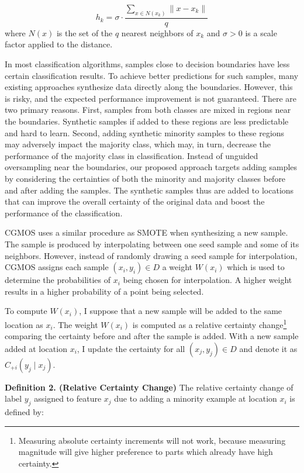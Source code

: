 \documentclass{iitthesis}
\begin{document}
\begin{equation}
h_k = \sigma \cdot \frac{\sum_{x \in N(x_k)} \| x-x_k \|}{q}
\end{equation}
where $N(x)$ is the set of the $q$ nearest neighbors of $x_k$ and $\sigma > 0$ is a scale factor applied to the distance. 

 In most classification algorithms, samples close to decision boundaries have less certain classification results. To achieve better predictions for such samples, many existing approaches synthesize data directly along the boundaries. However, this is risky, and the expected performance improvement is not guaranteed. There are two primary reasons. First, samples from both classes are mixed in regions near the boundaries. Synthetic samples if added to these regions are less predictable and hard to learn. Second, adding synthetic minority samples to these regions may adversely impact the majority class, which may, in turn, decrease the performance of the majority class in classification. Instead of unguided oversampling near the boundaries, our proposed approach targets adding samples by considering the certainties of both the minority and majority classes before and after adding the samples. The synthetic samples thus are added to locations that can improve the overall certainty of the original data and boost the performance of the classification.

CGMOS uses a similar procedure as SMOTE when synthesizing a new sample. The sample is produced by interpolating between one seed sample and some of its neighbors. However, instead of randomly drawing a seed sample for interpolation, CGMOS assigns each sample $(x_i, y_i) \in D$ a weight $W(x_i)$ which is used to determine the probabilities of $x_i$ being chosen for interpolation. A higher weight results in a higher probability of a point being selected.


To compute $W(x_i)$, I suppose that a new sample will be added to the same location as $x_i$. The weight $W(x_i)$ is computed as a relative certainty change\footnote{Measuring absolute certainty increments will not work, because measuring magnitude will give higher preference to parts which already have high certainty.} comparing the certainty before and after the sample is added. With a new sample added at location $x_i$, I update the certainty for all $(x_j, y_j) \in D$ and denote it as $C_{+i}(y_j \mid x_j)$. 

\noindent \textbf{Definition 2. (Relative Certainty Change)} The relative certainty change of label $y_j$ assigned to feature $x_j$ due to adding a minority example at location $x_i$ is defined by:
\end{document}

